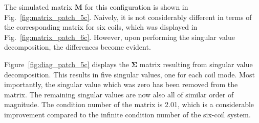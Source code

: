 






The simulated matrix $\bm{M}$ for this configuration is shown in
Fig.~\ref{fig:matrix_patch_5c}.  Naively, it is not considerably
different in terms of the corresponding matrix for six coils, which was
displayed in Fig.~\ref{fig:matrix_patch_6c}.  However, upon performing
the singular value decomposition, the differences become evident.




Figure~\ref{fig:diag_patch_5c} displays the $\bm{\Sigma}$ matrix
resulting from singular value decomposition.  This results in five
singular values, one for each coil mode.  Most importantly, the
singular value which was zero has been removed from the matrix.  The
remaining singular values are now also all of similar order of
magnitude.  The condition number of the matrix is 2.01, which is a
considerable improvement compared to the infinite condition number of
the six-coil system.

